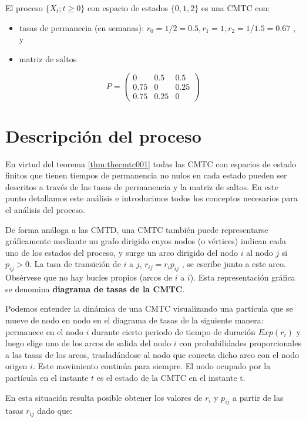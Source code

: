 \documentclass[
]{book}
\providecommand{\tightlist}{%
  \setlength{\itemsep}{0pt}\setlength{\parskip}{0pt}}
\theoremstyle{definition}
\theoremstyle{definition}
\theoremstyle{definition}
\theoremstyle{definition}
\theoremstyle{remark}
\begin{document}
El proceso \(\{X_t; t \geq 0\}\) con espacio de estados \(\{0, 1, 2\}\) es una CMTC con:

\begin{itemize}
\tightlist
\item
  tasas de permanecia (en semanas): \(r_0 = 1/2=0.5, r_1 = 1, r_2 = 1/1.5 =0.67\) , y
\item
  matriz de saltos
\end{itemize}

\[P = 
\begin{pmatrix}
0 & 0.5 & 0.5\\
0.75 & 0 & 0.25\\
0.75 & 0.25 & 0
\end{pmatrix}\]

\hypertarget{CMTCB}{%
\section{Descripción del proceso}\label{CMTCB}}

En virtud del teorema \ref{thm:thecmtc001} todas las CMTC con espacios de estado finitos que tienen tiempos de permanencia no nulos en cada estado pueden ser descritos a través de las tasas de permanencia y la matriz de saltos. En este punto detallamos este análisis e introducimos todos los conceptos necesarios para el análisis del proceso.

De forma análoga a las CMTD, una CMTC también puede representarse gráficamente mediante un grafo dirigido cuyos nodos (o vértices) indican cada uno de los estados del proceso, y surge un arco dirigido del nodo \(i\) al nodo \(j\) si \(p_{ij} > 0\). La tasa de transición de \(i\) a \(j\), \(r_{ij} = r_i p_{ij}\) , se escribe junto a este arco. Obsérvese que no hay bucles propios (arcos de \(i\) a \(i\)). Esta representación gráfica se denomina \textbf{diagrama de tasas de la CMTC}.

Podemos entender la dinámica de una CMTC visualizando una partícula que se mueve de nodo en nodo en el diagrama de tasas de la siguiente manera: permanece en el nodo \(i\) durante cierto periodo de tiempo de duración \(Exp(r_i)\) y luego elige uno de los arcos de salida del nodo \(i\) con probabilidades proporcionales a las tasas de los arcos, trasladándose al nodo que conecta dicho arco con el nodo origen \(i\). Este movimiento continúa para siempre. El nodo ocupado por la partícula en el instante \(t\) es el estado de la CMTC en el instante t.

En esta situación resulta posible obtener los valores de \(r_i\) y \(p_{ij}\) a partir de las tasas \(r_{ij}\) dado que:
\end{document}
